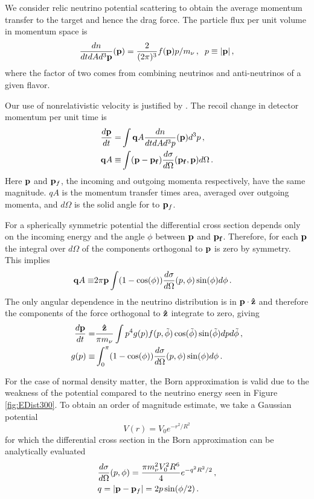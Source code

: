 We consider relic neutrino potential scattering to obtain the average momentum transfer to the target and hence the drag force. The particle flux per unit volume in momentum space is
\begin{equation}\label{dnQuantum}
\frac{dn}{dtd Ad^3{\bf p}}({\bf p})=\frac{2}{(2\pi)^3}f({\bf p})p/m_\nu\,,\hspace{2mm} p\equiv |{\bf p}|\,,
\end{equation}
where the factor of two comes from combining neutrinos and anti-neutrinos of a given flavor. 

Our use of nonrelativistic velocity is justified by  .  The recoil change in detector momentum per unit time is  
\begin{align}
\frac{d{\bf p}}{dt}=& \int  {\bf q}A \frac{dn}{dtdAd^3p}({\bf p})d^3p\,,\\
{\bf q}A\equiv &\int ({\bf p}-{\bf p_f})\frac{d\sigma}{ d\Omega}({\bf p_f},{\bf p})d\Omega\,.
\end{align}
Here ${\bf p}$ and ${\bf p}_f$, the incoming and outgoing momenta respectively, have the same magnitude. $qA$ is the momentum transfer times area, averaged over outgoing momenta, and $d\Omega$ is the solid angle for to ${\bf p}_f$.  

For a spherically symmetric potential the differential cross section depends only on the incoming energy and the angle $\phi$ between ${\bf p}$ and ${\bf p_f}$.  Therefore, for each ${\bf p}$ the integral over $d\Omega$ of the components orthogonal to ${\bf p}$ is zero by symmetry.  This implies
\begin{align}
{\bf q}A\equiv &2\pi{\bf p}\int(1-\cos(\phi))\frac{d\sigma}{ d\Omega}(p,\phi)\sin(\phi)d\phi\,.
\end{align}
The only angular dependence in the neutrino distribution is in ${\bf p}\cdot {\bf\hat z}$ and therefore the components of the force orthogonal to ${\bf \hat z}$ integrate to zero, giving
\begin{align}\label{drag}
\frac{d{\bf p}}{dt}=&\frac{{\bf\hat z}}{\pi m_\nu } \int p^4g(p) f(p,\tilde\phi) \cos(\tilde\phi) \sin(\tilde\phi) dpd\tilde\phi\,,\\
g(p)\equiv& \int_0^\pi(1-\cos(\phi))\frac{d\sigma}{ d\Omega}(p,\phi)\sin(\phi)d\phi\,.\label{geq}
\end{align}

For the case of normal density matter, the Born approximation is valid due to the weakness of the potential compared to the neutrino energy seen in Figure \ref{fig:EDist300}. To obtain an order of magnitude estimate, we take a Gaussian potential \begin{equation}
V(r)=V_0e^{-r^2/R^2}
\end{equation}
for which the differential cross section in the Born approximation can be analytically evaluated
\begin{align}
&\frac{d\sigma}{ d\Omega}(p,\phi)=\frac{\pi m_\nu^2V_0^2R^6}{4}e^{-q^2R^2/2}\,,\notag\\
&q=|{\bf p}-{\bf p}_f|=2p\sin(\phi/2)\,.
\end{align}


